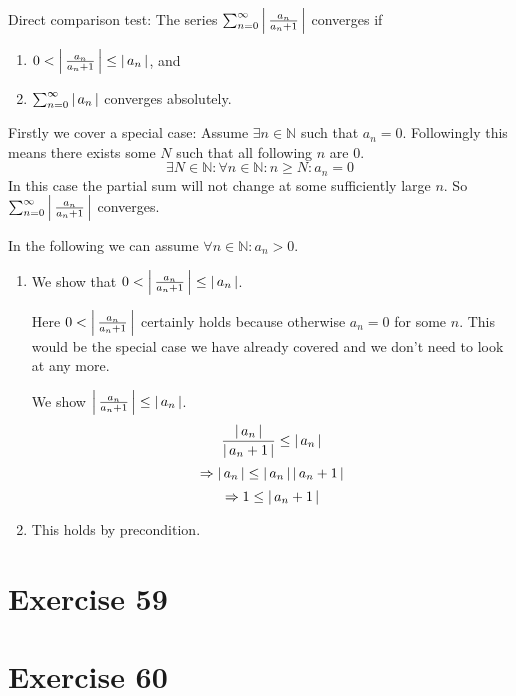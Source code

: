 \documentclass[a4paper]{article}
\theoremstyle{definition}
\newcommand\abs[1]{\left|\thinspace #1\thinspace\right|}
\begin{document}
Direct comparison test:
The series $\sum_{n=0}^\infty \abs{\frac{a_n}{a_n + 1}}$ converges if
\begin{enumerate}
  \item $0 < \abs{\frac{a_n}{a_{n} + 1}} \leq \abs{a_n}$, and
  \item $\sum_{n=0}^\infty \abs{a_n}$ converges absolutely.
\end{enumerate}

\begin{mdframed}
  Firstly we cover a special case: Assume $\exists n \in \mathbb N$ such that $a_n = 0$.
  Followingly this means there exists some $N$ such that all following $n$ are $0$.
  \[ \exists N \in \mathbb N: \forall n \in \mathbb N: n \geq N: a_n = 0 \]
  In this case the partial sum will not change at some sufficiently large $n$.
  So $\sum_{n=0}^\infty \abs{\frac{a_n}{a_n + 1}}$ converges.

  In the following we can assume $\forall n \in \mathbb N: a_n > 0$.
\end{mdframed}

\begin{enumerate}
  \item We show that $0 < \abs{\frac{a_n}{a_n + 1}} \leq \abs{a_n}$.

    Here $0 < \abs{\frac{a_n}{a_n + 1}}$ certainly holds because otherwise $a_n = 0$
    for some $n$. This would be the special case we have already covered and
    we don't need to look at any more.

    We show $\abs{\frac{a_n}{a_n + 1}} \leq \abs{a_n}$.
    \[ \frac{\abs{a_n}}{\abs{a_n + 1}} \leq \abs{a_n} \]
    \[ \Rightarrow \abs{a_n} \leq \abs{a_n} \abs{a_n + 1} \]
    \[ \Rightarrow 1 \leq \abs{a_n + 1} \]

  \item This holds by precondition.
\end{enumerate}

\section{Exercise 59}


\section{Exercise 60}
\end{document}
